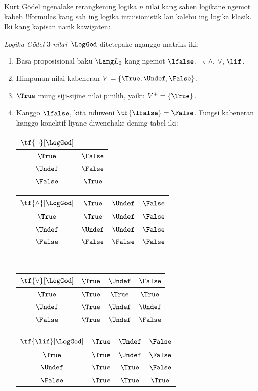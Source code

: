 \documentclass[../../../include/open-logic-section]{subfiles}
\begin{document}


Kurt G\"odel ngenalake rerangkening logika $n$ nilai kang
saben logikane ngemot kabeh !!{formula}s kang sah ing logika
intuisionistik lan kalebu ing logika klasik. Iki kang kapisan
narik kawigaten:

\begin{defn}
\emph{Logika G\"odel $3$ nilai}~$\LogGod$ ditetepake nganggo matriks iki:
\begin{enumerate}
  \item Basa proposisional baku $\Lang L_0$ kang ngemot
  $\lfalse$, $\lnot$, $\land$, $\lor$, $\lif$.
  \item Himpunan nilai kabeneran $V = \{\True, \Undef, \False\}$.
  \item $\True$ mung siji-sijine nilai pinilih, yaiku $V^+ = \{\True\}$.
  \item Kanggo $\lfalse$, kita nduweni $\tf{\lfalse} = \False$.
  Fungsi kabeneran kanggo konektif liyane diwenehake dening
  tabel iki:
  \begin{center}
    \begin{tabular}{c|c} 
      $\tf{\lnot}[\LogGod]$ & \\ 
      \hline  
      $\True$ & $\False$ \\ 
      $\Undef$ & $\False$ \\
      $\False$ & $\True$ 
    \end{tabular}
    \quad
    \begin{tabular}{c|ccc} 
      $\tf{\land}[\LogGod]$ & $\True$ & $\Undef$ & $\False$ \\ 
      \hline 
      $\True$ & $\True$ & $\Undef$ & $\False$ \\ 
      $\Undef$ & $\Undef$ & $\Undef$ & $\False$\\ 
      $\False$ & $\False$ & $\False$ & $\False$ 
    \end{tabular}
    \\[2ex]
    \begin{tabular}{c|ccc} 
      $\tf{\lor}[\LogGod]$ & $\True$ & $\Undef$ & $\False$ \\ 
      \hline 
      $\True$ & $\True$ & $\True$ & $\True$ \\ 
      $\Undef$ & $\True$ & $\Undef$ & $\Undef$ \\
      $\False$ & $\True$ & $\Undef$ & $\False$ 
    \end{tabular}
    \quad
    \begin{tabular}{c|ccc} 
      $\tf{\lif}[\LogGod]$ & $\True$ & $\Undef$ & $\False$ \\ 
      \hline 
      $\True$ & $\True$ & $\Undef$ & $\False$ \\ 
      $\Undef$ & $\True$ & $\True$ & $\False$  \\ 
      $\False$ & $\True$ & $\True$ & $\True$ 
    \end{tabular}
  \end{center} 
\end{enumerate}
\end{defn}
\end{document}

